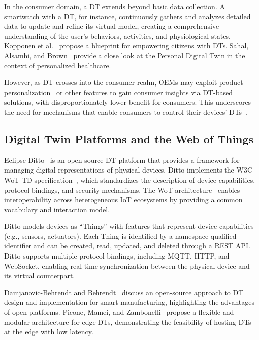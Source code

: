 In the consumer domain, a \ac{DT} extends beyond basic data collection.
A smartwatch with a \ac{DT}, for instance, continuously gathers and analyzes detailed data to update and refine its virtual model, creating a comprehensive understanding of the user's behaviors, activities, and physiological states.
Kopponen et al.~\cite{kopponen:hahto:kettunen:etal:2022} propose a blueprint for empowering citizens with \acp{DT}.
Sahal, Alsamhi, and Brown~\cite{sahal:alsamhi:brown:2022} provide a close look at the Personal Digital Twin in the context of personalized healthcare.

However, as \ac{DT} crosses into the consumer realm, \acp{OEM} may exploit product personalization~\cite{thiesse:2007} or other features to gain consumer insights via \ac{DT}-based solutions, with disproportionately lower benefit for consumers.
This underscores the need for mechanisms that enable consumers to control their devices' \acp{DT}~\cite{kopponen:hahto:kettunen:etal:2022}.

\subsection{Digital Twin Platforms and the Web of Things}
\label{subsec:dt-platforms}

Eclipse Ditto~\cite{eclipse:ditto} is an open-source \ac{DT} platform that provides a framework for managing digital representations of physical devices.
Ditto implements the \ac{W3C} \ac{WoT} \ac{TD} specification~\cite{kaebisch:kamiya:mccool:charpenay:kovatsch:2020}, which standardizes the description of device capabilities, protocol bindings, and security mechanisms.
The \ac{WoT} architecture~\cite{w3c:wot:architecture:2020} enables interoperability across heterogeneous \ac{IoT} ecosystems by providing a common vocabulary and interaction model.

Ditto models devices as ``Things'' with features that represent device capabilities (e.g., sensors, actuators).
Each Thing is identified by a namespace-qualified identifier and can be created, read, updated, and deleted through a REST API.
Ditto supports multiple protocol bindings, including \ac{MQTT}, HTTP, and WebSocket, enabling real-time synchronization between the physical device and its virtual counterpart.

Damjanovic-Behrendt and Behrendt~\cite{damjanovic:behrendt:2019} discuss an open-source approach to \ac{DT} design and implementation for smart manufacturing, highlighting the advantages of open platforms.
Picone, Mamei, and Zambonelli~\cite{picone:mamei:zambonelli:2023} propose a flexible and modular architecture for edge \acp{DT}, demonstrating the feasibility of hosting \acp{DT} at the edge with low latency.

